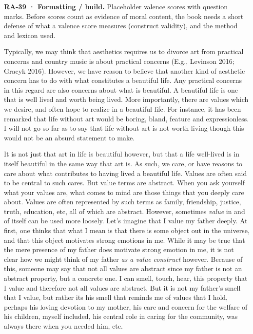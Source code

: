 \documentclass[
  letterpaper,
  DIV=11,
  numbers=noendperiod]{scrartcl}
\theoremstyle{remark}
\begin{document}
\begin{tcolorbox}[enhanced jigsaw, arc=.35mm, bottomrule=.15mm, bottomtitle=1mm, breakable, colback=white, colbacktitle=quarto-callout-note-color!10!white, colframe=quarto-callout-note-color-frame, coltitle=black, left=2mm, leftrule=.75mm, opacityback=0, opacitybacktitle=0.6, rightrule=.15mm, title=\textcolor{quarto-callout-note-color}{\faInfo}\hspace{0.5em}{Note}, titlerule=0mm, toprule=.15mm, toptitle=1mm]

\textbf{RA-39 · Formatting / build.} Placeholder valence scores with
question marks. Before scores count as evidence of moral content, the
book needs a short defense of what a valence score measures (construct
validity), and the method and lexicon used.

\end{tcolorbox}

Typically, we may think that aesthetics requires us to divorce art from
practical concerns and country music is about practical concerns (E.g.,
Levinson 2016; Gracyk 2016). However, we have reason to believe that
another kind of aesthetic concern has to do with what constitutes a
beautiful life. Any practical concerns in this regard are also concerns
about what is beautiful. A beautiful life is one that is well lived and
worth being lived. More importantly, there are values which we desire,
and often hope to realize in a beautiful life. For instance, it has been
remarked that life without art would be boring, bland, feature and
expressionless. I will not go so far as to say that life without art is
not worth living though this would not be an absurd statement to make.

It is not just that art in life is beautiful however, but that a life
well-lived is in itself beautiful in the same way that art is. As such,
we care, or have reasons to care about what contributes to having lived
a beautiful life. Values are often said to be central to such cares. But
value terms are abstract. When you ask yourself what your values are,
what comes to mind are those things that you deeply care about. Values
are often represented by such terms as family, friendship, justice,
truth, education, etc, all of which are abstract. However, sometimes
\emph{value} in and of itself can be used more loosely. Let's imagine
that I value my father deeply. At first, one thinks that what I mean is
that there is some object out in the universe, and that this object
motivates strong emotions in me. While it may be true that the mere
presence of my father does motivate strong emotion in me, it is not
clear how we might think of my father \emph{as a value construct}
however. Because of this, someone may say that not all values are
abstract since my father is not an abstract property, but a concrete
one. I can smell, touch, hear, this property that I value and therefore
not all values are abstract. But it is not my father's smell that I
value, but rather its his smell that reminds me of values that I hold,
perhaps his loving devotion to my mother, his care and concern for the
welfare of his children, myself included, his central role in caring for
the community, was always there when you needed him, etc.
\end{document}
